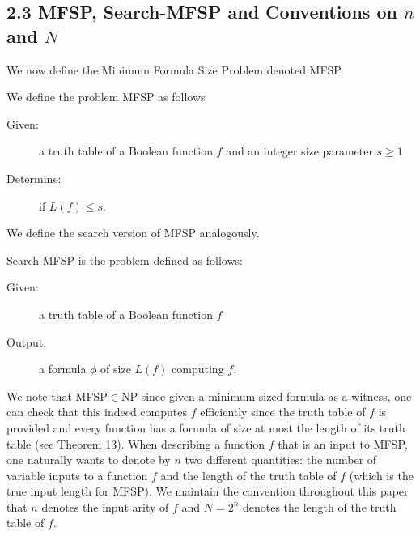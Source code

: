 \subsection*{2.3 MFSP, Search-MFSP and Conventions on $n$ and $N$}
We now define the Minimum Formula Size Problem denoted MFSP.
\setcounter{nttheorem}{9}
\begin{ntdefinition}
We define the problem MFSP as follows
\begin{description}\item[Given:] a truth table of a Boolean function $f$ and an integer size parameter $s\geq 1$\item[Determine:] if $L(f)\leq s$.\end{description}
\end{ntdefinition}
We define the search version of MFSP analogously.
\begin{ntdefinition}
Search-MFSP is the problem defined as follows:
\begin{description}\item[Given:] a truth table of a Boolean function $f$\item[Output:] a formula $\phi$ of size $L(f)$ computing $f$.\end{description}
\end{ntdefinition}
We note that MFSP$\in\mathrm{NP}$ since given a minimum-sized formula as a witness, one can check that this indeed computes $f$ efficiently since the truth table of $f$ is provided and every function has a formula of size at most the length of its truth table (see Theorem 13).
When describing a function $f$ that is an input to MFSP, one naturally wants to denote by $n$ two different quantities: the number of variable inputs to a function $f$ and the length of the truth table of $f$ (which is the true input length for MFSP). We maintain the convention throughout this paper that $n$ denotes the input arity of $f$ and $N=2^n$ denotes the length of the truth table of $f$.
